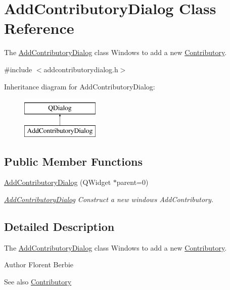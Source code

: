 \hypertarget{classAddContributoryDialog}{\section{Add\+Contributory\+Dialog Class Reference}
\label{classAddContributoryDialog}
}


The \hyperlink{classAddContributoryDialog}{Add\+Contributory\+Dialog} class Windows to add a new \hyperlink{classContributory}{Contributory}.  




{\ttfamily \#include $<$addcontributorydialog.\+h$>$}

Inheritance diagram for Add\+Contributory\+Dialog\+:\begin{figure}[H]
\begin{center}
\leavevmode
\includegraphics[height=2.000000cm]{d9/dfa/classAddContributoryDialog}
\end{center}
\end{figure}
\subsection*{Public Member Functions}
\begin{DoxyCompactItemize}
\item 
\hyperlink{classAddContributoryDialog_a75ef0d55afcf2cc30a702bb4792ccc2b}{Add\+Contributory\+Dialog} (Q\+Widget $\ast$parent=0)
\begin{DoxyCompactList}\small\item\em \hyperlink{classAddContributoryDialog}{Add\+Contributory\+Dialog} Construct a new windows Add\+Contributory. \end{DoxyCompactList}\end{DoxyCompactItemize}


\subsection{Detailed Description}
The \hyperlink{classAddContributoryDialog}{Add\+Contributory\+Dialog} class Windows to add a new \hyperlink{classContributory}{Contributory}. 

\begin{DoxyAuthor}{Author}
Florent Berbie 
\end{DoxyAuthor}
\begin{DoxySeeAlso}{See also}
\hyperlink{classContributory}{Contributory} 
\end{DoxySeeAlso}


